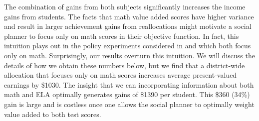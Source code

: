 \documentclass[12pt]{article}
\theoremstyle{definition}
\theoremstyle{definition}
\theoremstyle{definition}
\theoremstyle{definition}
\begin{document}
The combination of gains from both subjects significantly increases the income gains from students.
The facts that math value added scores have higher variance and result in larger achievement gains from reallocations might motivate a social planner to focus only on math scores in their objective function. In fact, this intuition plays out in the policy experiments considered in \citet{Delgado2020} and \citet{bates2022teacher} which both focus only on math. Surprisingly, our results overturn this intuition. We will discuss the details of how we obtain these numbers below, but we find that a district-wide allocation that focuses only on math scores increases average present-valued earnings by \$1030. The insight that we can incorporating information about both math and ELA optimally generates gains of \$1390 per student. This \$360 (34\%) gain is large and is costless once one allows the social planner to optimally weight value added to both test scores.
\end{document}
